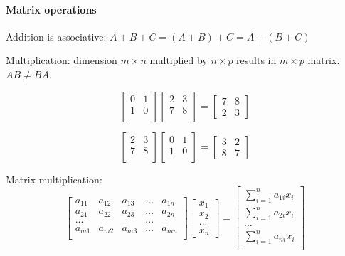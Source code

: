 \documentclass[12pt]{article}
\newcommand{\<}{\langle}
\renewcommand{\>}{\rangle}
\begin{document}
\paragraph{Matrix operations} Addition is associative: $A+B+C = (A+B) + C = A+ (B+C)$

Multiplication: dimension $m \times n$ multiplied by $n \times p$ results in $m \times p$ matrix. $AB \neq BA$.

\[
	\begin{bmatrix}
		0 & 1 \\ 1 & 0\\
	\end{bmatrix}
	\begin{bmatrix}
		2 & 3 \\ 7 & 8 \\ 
	\end{bmatrix} =
	\begin{bmatrix}
		7 & 8 \\ 2 & 3
	\end{bmatrix}
\]

\[
	\begin{bmatrix}
		2 & 3 \\ 7 & 8 \\ 
	\end{bmatrix} 
	\begin{bmatrix}
		0 & 1 \\ 1 & 0\\
	\end{bmatrix}=
	\begin{bmatrix}
		3 & 2 \\ 8 & 7
	\end{bmatrix}
\]

Matrix multiplication:
\[
	\begin{bmatrix}
	a_{11} & a_{12} & a_{13} & ... & a_{1n} \\
	a_{21} & a_{22} & a_{23} & ... & a_{2n} \\
	... & &  & ... &  \\
	a_{m1} & a_{m2} & a_{m3}& ... & a_{mn} \\
	\end{bmatrix}
	\begin{bmatrix}
		x_1 \\ x_2 \\ ... \\ x_n
	\end{bmatrix} = 
	\begin{bmatrix}
		\sum_{i=1}^n a_{1i}x_i \\
		\sum_{i=1}^n a_{2i}x_i \\ 
		... \\
		\sum_{i=1}^n a_{ni}x_i\\
	\end{bmatrix}
\]
\end{document}
